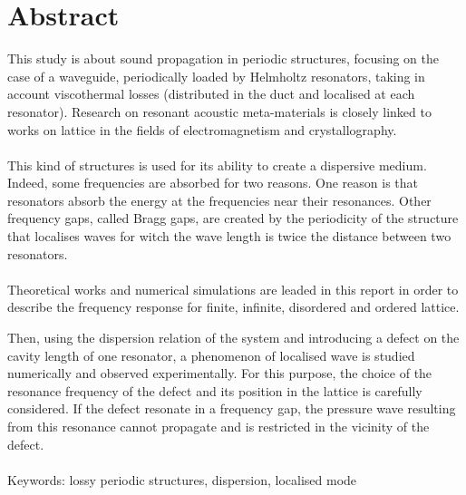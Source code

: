 \section*{Abstract}

This study is about sound propagation in periodic structures, focusing on the case of a waveguide, periodically loaded by Helmholtz resonators, taking in account viscothermal losses (distributed in the duct and localised at each resonator). Research on resonant acoustic meta-materials is closely linked to works on lattice in the fields of electromagnetism and crystallography.\\~\\ %


This kind of structures is used for its ability to create a dispersive medium. Indeed, some frequencies are absorbed for two reasons. One reason is that resonators absorb the energy at the frequencies near their resonances. Other frequency gaps, called Bragg gaps, are created by the periodicity of the structure that localises waves for witch the wave length is twice the distance between two resonators.\\~\\

Theoretical works and numerical simulations are leaded in this report in order to describe the frequency response for finite, infinite, disordered and ordered lattice. 

Then, using the dispersion relation of the system and introducing a defect on the cavity length of one resonator, a phenomenon of localised wave is studied numerically and observed experimentally. For this purpose, the choice of the resonance frequency of the defect and its position in the lattice is carefully considered. If the defect resonate in a frequency gap, the pressure wave resulting from this resonance cannot propagate and is restricted in the vicinity of the defect.\\~\\ 


Keywords: lossy periodic structures, dispersion, localised mode 





